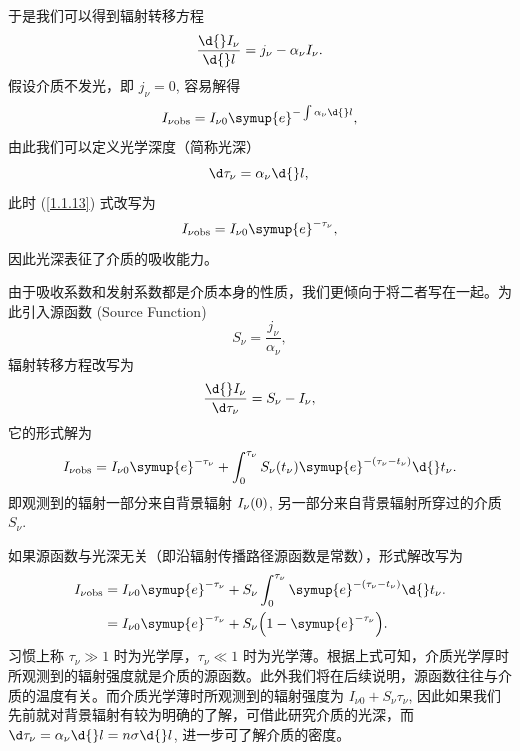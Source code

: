 \documentclass[../天体物理基础.tex]{subfiles}
\begin{document}
于是我们可以得到辐射转移方程
\begin{equation}
\frac{\d{}I_{\nu}}{\d{}l}=j_{\nu}-\alpha_{\nu}I_{\nu}.
\end{equation}
假设介质不发光，即 $j_{\nu}=0$, 容易解得
\begin{equation}
I_{\nu\mathrm{obs}}=I_{\nu0}\symup{e}^{-\int\alpha_{\nu}\d{}l},\label{1.1.13}
\end{equation}
由此我们可以定义光学深度（简称光深）
\begin{equation}
\d\tau_{\nu}=\alpha_{\nu}\d{}l,\\
\end{equation}
此时 (\ref{1.1.13}) 式改写为
\begin{equation}
I_{\nu\mathrm{obs}}=I_{\nu0}\symup{e}^{-\tau_{\nu}},\label{1.1.15}
\end{equation}
因此光深表征了介质的吸收能力。

由于吸收系数和发射系数都是介质本身的性质，我们更倾向于将二者写在一起。为此引入源函数 (Source Function)
\begin{equation}
S_{\nu}=\frac{j_{\nu}}{\alpha_{\nu}},
\end{equation}
辐射转移方程改写为
\begin{equation}
\frac{\d{}I_{\nu}}{\d\tau_{\nu}}=S_{\nu}-I_{\nu},
\end{equation}
它的形式解为
\begin{equation}
I_{\nu\mathrm{obs}}=I_{\nu0}\symup{e}^{-\tau_{\nu}}+\int^{\tau_{\nu}}_{0}S_{\nu}\mleft(t_{\nu}\mright)\symup{e}^{-\mleft(\tau_{\nu}-t_{\nu}\mright)}\d{}t_{\nu}.
\end{equation}
即观测到的辐射一部分来自背景辐射 $I_{\nu}\mleft(0\mright)$, 另一部分来自背景辐射所穿过的介质 $S_{\nu}$.

如果源函数与光深无关（即沿辐射传播路径源函数是常数），形式解改写为
\begin{align}
I_{\nu\mathrm{obs}}&=I_{\nu0}\symup{e}^{-\tau_{\nu}}+S_{\nu}\int^{\tau_{\nu}}_{0}\symup{e}^{-\mleft(\tau_{\nu}-t_{\nu}\mright)}\d{}t_{\nu}.\notag\\
&=I_{\nu0}\symup{e}^{-\tau_{\nu}}+S_{\nu}\mleft(1-\symup{e}^{-\tau_{\nu}}\mright).
\end{align}
习惯上称 $\tau_{\nu}\gg1$ 时为光学厚，$\tau_{\nu}\ll1$ 时为光学薄。根据上式可知，介质光学厚时所观测到的辐射强度就是介质的源函数。此外我们将在后续说明，源函数往往与介质的温度有关。而介质光学薄时所观测到的辐射强度为 $I_{\nu0}+S_{{\nu}}\tau_{\nu}$, 因此如果我们先前就对背景辐射有较为明确的了解，可借此研究介质的光深，而 $\d\tau_{\nu}=\alpha_{\nu}\d{}l=n\sigma\d{}l$, 进一步可了解介质的密度。
\end{document}
